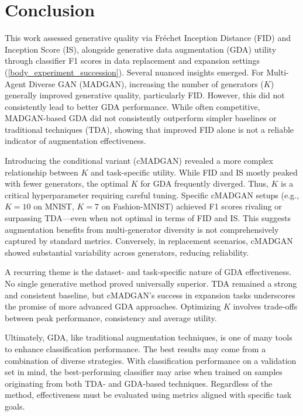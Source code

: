 \section{Conclusion}\label{conclusion}

This work assessed generative quality via Fréchet Inception Distance (FID) and Inception Score (IS), alongside generative data augmentation (GDA) utility through classifier F1 scores in data replacement and expansion settings (\ref{body_experiment_succession}). Several nuanced insights emerged. For Multi-Agent Diverse GAN (MADGAN), increasing the number of generators (\(K\)) generally improved generative quality, particularly FID. However, this did not consistently lead to better GDA performance. While often competitive, MADGAN-based GDA did not consistently outperform simpler baselines or traditional techniques (TDA), showing that improved FID alone is not a reliable indicator of augmentation effectiveness.

Introducing the conditional variant (cMADGAN) revealed a more complex relationship between \(K\) and task-specific utility. While FID and IS mostly peaked with fewer generators, the optimal \(K\) for GDA frequently diverged. Thus, \(K\) is a critical hyperparameter requiring careful tuning. Specific cMADGAN setups (e.g., \(K=10\) on MNIST, \(K=7\) on Fashion-MNIST) achieved F1 scores rivaling or surpassing TDA—even when not optimal in terms of FID and IS. This suggests augmentation benefits from multi-generator diversity is not comprehensively captured by standard metrics. Conversely, in replacement scenarios, cMADGAN showed substantial variability across generators, reducing reliability.

A recurring theme is the dataset- and task-specific nature of GDA effectiveness. No single generative method proved universally superior. TDA remained a strong and consistent baseline, but cMADGAN’s success in expansion tasks underscores the promise of more advanced GDA approaches. Optimizing \(K\) involves trade-offs between peak performance, consistency and average utility.

Ultimately, GDA, like traditional augmentation techniques, is one of many tools to enhance classification performance. The best results may come from a combination of diverse strategies. With classification performance on a validation set in mind, the best-performing classifier may arise when trained on samples originating from both TDA- and GDA-based techniques. Regardless of the method, effectiveness must be evaluated using metrics aligned with specific task goals.


